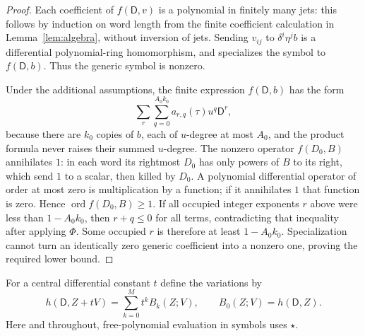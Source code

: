 \documentclass{article}
\newcommand{\DD}{\mathsf D}
\newcommand{\ord}{\operatorname{ord}}
\begin{document}
\begin{proof}
Each coefficient of $f(\DD,v)$ is a polynomial in finitely many jets: this follows by induction on word length from the finite coefficient calculation in Lemma~\ref{lem:algebra}, without inversion of jets. Sending $v_{ij}$ to $\delta^i\eta^jb$ is a differential polynomial-ring homomorphism, and specializes the symbol to $f(\DD,b)$. Thus the generic symbol is nonzero.

Under the additional assumptions, the finite expression $f(\DD,b)$ has the form
\[
 \sum_r\sum_{q=0}^{A_0k_0} a_{r,q}(\tau)u^q\DD^r,
\]
because there are $k_0$ copies of $b$, each of $u$-degree at most $A_0$, and the product formula never raises their summed $u$-degree. The nonzero operator $f(D_0,B)$ annihilates $1$: in each word its rightmost $D_0$ has only powers of $B$ to its right, which send $1$ to a scalar, then killed by $D_0$. A polynomial differential operator of order at most zero is multiplication by a function; if it annihilates $1$ that function is zero. Hence $\ord f(D_0,B)\geq1$. If all occupied integer exponents $r$ above were less than $1-A_0k_0$, then $r+q\leq0$ for all terms, contradicting that inequality after applying $\Phi$. Some occupied $r$ is therefore at least $1-A_0k_0$. Specialization cannot turn an identically zero generic coefficient into a nonzero one, proving the required lower bound.
\end{proof}

For a central differential constant $t$ define the variations by
\[
 h(\DD,Z+tV)=\sum_{k=0}^M t^k B_k(Z;V),\qquad B_0(Z;V)=h(\DD,Z).
 \tag{3.4}\label{eq:variations}
\]
Here and throughout, free-polynomial evaluation in symbols uses $\star$.
\end{document}
